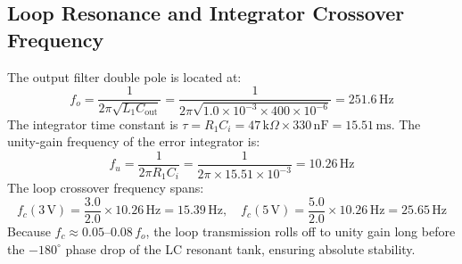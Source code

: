 \documentclass[12pt,a4paper]{article}
\begin{document}
\subsection{Loop Resonance and Integrator Crossover Frequency}
The output filter double pole is located at:
\begin{equation*}
    f_o = \frac{1}{2\pi \sqrt{L_1 C_{\mathrm{out}}}} = \frac{1}{2\pi \sqrt{1.0\times 10^{-3} \times 400\times 10^{-6}}} = \mathbf{251.6\,\mathrm{Hz}}
\end{equation*}
The integrator time constant is $\tau = R_1 C_i = 47\,\mathrm{k}\Omega \times 330\,\mathrm{nF} = 15.51\,\mathrm{ms}$.
The unity-gain frequency of the error integrator is:
\begin{equation*}
    f_u = \frac{1}{2\pi R_1 C_i} = \frac{1}{2\pi \times 15.51\times 10^{-3}} = \mathbf{10.26\,\mathrm{Hz}}
\end{equation*}
The loop crossover frequency spans:
\begin{equation*}
    f_c(3\,\mathrm{V}) = \frac{3.0}{2.0} \times 10.26\,\mathrm{Hz} = \mathbf{15.39\,\mathrm{Hz}}, \quad f_c(5\,\mathrm{V}) = \frac{5.0}{2.0} \times 10.26\,\mathrm{Hz} = \mathbf{25.65\,\mathrm{Hz}}
\end{equation*}
Because $f_c \approx 0.05\text{--}0.08\,f_o$, the loop transmission rolls off to unity gain long before the $-180^\circ$ phase drop of the LC resonant tank, ensuring absolute stability.
\end{document}
